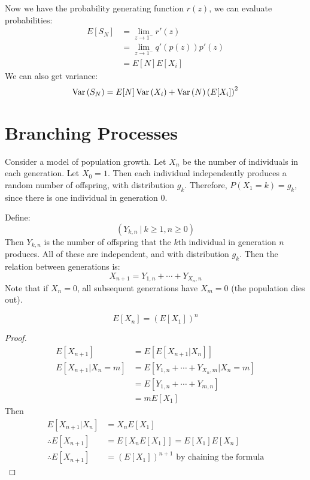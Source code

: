\documentclass[../Main.tex]{subfiles}
\begin{document}
Now we have the probability generating function $r(z)$, we can evaluate probabilities:
\begin{align*}
    E[S_N] &= \lim_{z \to 1^-} r'(z) \\
    &= \lim_{z \to 1^-} q'(p(z)) p'(z) \\
    &= E[N] E[X_i]
\end{align*}
We can also get variance:
\begin{equation*}
    \operatorname{Var}{(S_N)} = E[N] \operatorname{Var}{(X_i)} + \operatorname{Var}{(N)} \left(E[X_i]\right)^2
\end{equation*}
\section{Branching Processes}
Consider a model of population growth. Let $X_n$ be the number of individuals in each generation. Let $X_0 = 1$. Then each individual independently produces a random number of offspring, with distribution $g_k$. Therefore, $P(X_1 = k) = g_k$, since there is one individual in generation $0$.\par
Define:
\begin{equation*}
    \left(Y_{k, n}~|~k \geq 1, n \geq 0\right)
\end{equation*}
Then $Y_{k, n}$ is the number of offspring that the $k$th individual in generation $n$ produces. All of these are independent, and with distribution $g_k$. Then the relation between generations is:
\begin{equation*}
    X_{n + 1} = Y_{1, n} + \cdots + Y_{{X_n}, n}
\end{equation*}
Note that if $X_n = 0$, all subsequent generations have $X_m = 0$ (the population dies out).
\begin{theorem}
    \begin{equation*}
        E[X_n] = \left(E[X_1]\right)^n
    \end{equation*}
    \label{thmBranchingExpectation}
\end{theorem}
\begin{proof}
    \begin{align*}
        E[X_{n + 1}] &= E[E[X_{n + 1} | X_n]] \\
        E[X_{n + 1} | X_n = m] &= E[Y_{1, n} + \cdots + Y_{{X_n}, m} | X_n = m] \\
        &= E[Y_{1, n} + \cdots + Y_{m, n}] \\
        &= mE[X_1]
    \end{align*}
    Then
    \begin{align*}
        E[X_{n + 1} | X_n] &= X_n E[X_1] \\
        \therefore E[X_{n + 1}] &= E[X_n E[X_1]] = E[X_1] E[X_n] \\
        \therefore E[X_{n + 1}] &= \left(E[X_1]\right)^{n + 1} \text{ by chaining the formula}
    \end{align*}
\end{proof}
\end{document}
